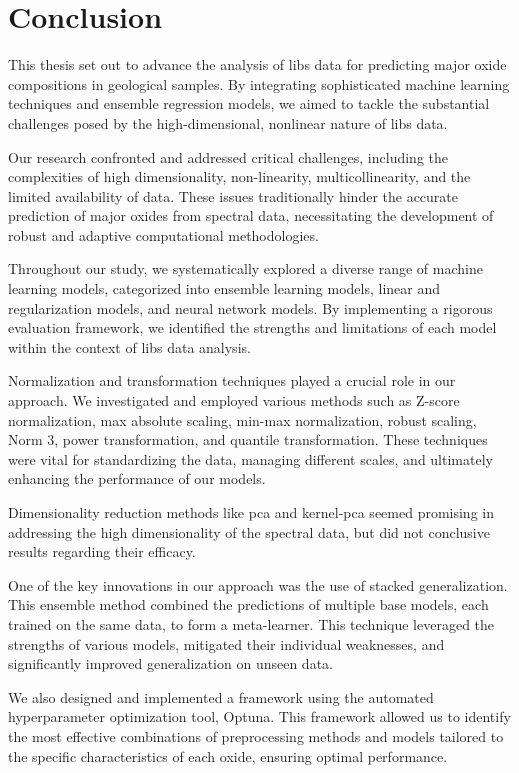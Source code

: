 \section{Conclusion}\label{sec:conclusion}
This thesis set out to advance the analysis of \gls{libs} data for predicting major oxide compositions in geological samples.
By integrating sophisticated machine learning techniques and ensemble regression models, we aimed to tackle the substantial challenges posed by the high-dimensional, nonlinear nature of \gls{libs} data.

Our research confronted and addressed critical challenges, including the complexities of high dimensionality, non-linearity, multicollinearity, and the limited availability of data.
These issues traditionally hinder the accurate prediction of major oxides from spectral data, necessitating the development of robust and adaptive computational methodologies.

Throughout our study, we systematically explored a diverse range of machine learning models, categorized into ensemble learning models, linear and regularization models, and neural network models.
By implementing a rigorous evaluation framework, we identified the strengths and limitations of each model within the context of \gls{libs} data analysis.

Normalization and transformation techniques played a crucial role in our approach.
We investigated and employed various methods such as Z-score normalization, max absolute scaling, min-max normalization, robust scaling, Norm 3, power transformation, and quantile transformation.
These techniques were vital for standardizing the data, managing different scales, and ultimately enhancing the performance of our models.

Dimensionality reduction methods like \gls{pca} and \gls{kernel-pca} seemed promising in addressing the high dimensionality of the spectral data, but did not conclusive results regarding their efficacy.

One of the key innovations in our approach was the use of stacked generalization.
This ensemble method combined the predictions of multiple base models, each trained on the same data, to form a meta-learner.
This technique leveraged the strengths of various models, mitigated their individual weaknesses, and significantly improved generalization on unseen data.

We also designed and implemented a framework using the automated hyperparameter optimization tool, Optuna.
This framework allowed us to identify the most effective combinations of preprocessing methods and models tailored to the specific characteristics of each oxide, ensuring optimal performance.

